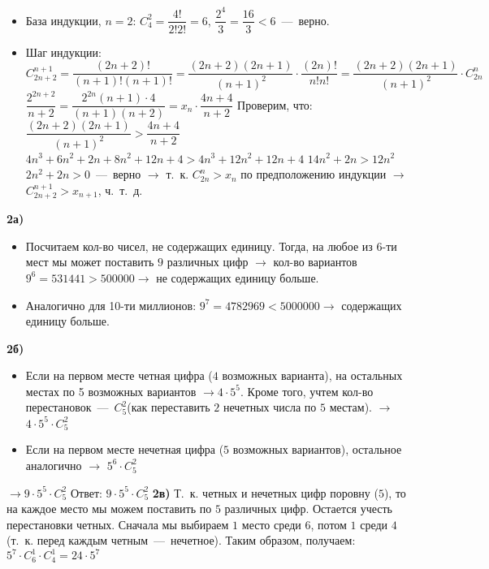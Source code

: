 \documentclass[12pt,a4paper,fleqn]{article}
\begin{document}
\begin{itemize} 
\item База индукции, $n = 2$: $C_4^2 = \dfrac{4!}{2!2!} = 6$, $\dfrac{2^4}{3} = \dfrac{16}{3} < 6$~---~верно.
\item Шаг индукции: $C_{2n + 2}^{n + 1} = \dfrac{(2n + 2)!}{(n + 1)!(n + 1)!} = \dfrac{(2n + 2)(2n + 1)}{(n + 1)^2} \cdot\dfrac{(2n)!}{n!n!} = \dfrac{(2n + 2)(2n + 1)}{(n + 1)^2} \cdot C_{2n}^n$ \newline
$\dfrac{2^{2n + 2}}{n + 2} = \dfrac{2^{2n}(n + 1) \cdot 4}{(n + 1)(n + 2)} = x_n \cdot \dfrac{4n + 4}{n + 2}$ \newline
Проверим, что: $\dfrac{(2n + 2)(2n + 1)}{(n + 1)^2} > \dfrac{4n + 4}{n + 2}$ \newline
$4n^3 + 6n^2 + 2n + 8n^2 + 12n + 4 > 4n^3 + 12n^2 + 12n + 4$ \newline
$14n^2 + 2n > 12n^2$ \newline
$2n^2 + 2n > 0$~---~верно $\rightarrow$ т.~к. $C_{2n}^n > x_n$ по предположению индукции $\rightarrow$ $C_{2n + 2}^{n + 1} > x_{n + 1}$, ч.~т.~д. \newline
\end{itemize}
{\bf 2а)}
\begin{itemize}
\item Посчитаем кол-во чисел, не содержащих единицу. Тогда, на любое из 6-ти мест мы может поставить $9$ различных цифр $\rightarrow$ кол-во вариантов $9^6 = 531441 > 500000 \rightarrow$ не содержащих единицу больше.
\item Аналогично для 10-ти миллионов: $9^7 = 4782969 < 5000000 \rightarrow$ содержащих единицу больше.
\end{itemize}
{\bf 2б)}
\begin{itemize}
\item Если на первом месте четная цифра ($4$ возможных варианта), на остальных местах по 5 возможных вариантов $\rightarrow 4 \cdot 5^5$. Кроме того, учтем кол-во перестановок~---~$C_5^2$(как переставить $2$ нечетных числа по $5$ местам). $\rightarrow$ $4 \cdot 5^5 \cdot C_5^2$
\item Если на первом месте нечетная цифра ($5$ возможных вариантов), остальное аналогично $\rightarrow$ $5 ^ 6 \cdot C_5^2$
\end{itemize}
$\rightarrow 9 \cdot 5^5 \cdot C_5^2$ \newline
Ответ: $9 \cdot 5^5 \cdot C_5^2$ \newline \newline
{\bf 2в)} Т.~к. четных и нечетных цифр поровну ($5$), то на каждое место мы можем поставить по $5$ различных цифр. Остается учесть перестановки четных. Сначала мы выбираем $1$ место среди $6$, потом $1$ среди $4$ (т.~к. перед каждым четным~---~нечетное). Таким образом, получаем: $5^7 \cdot C_6^1 \cdot C_4^1 = 24 \cdot 5^7$ \newline
\end{document}
